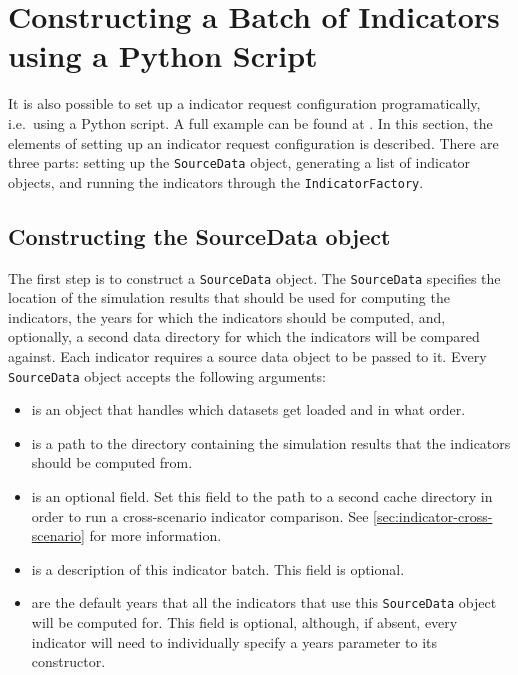 \section{Constructing a Batch of Indicators using a Python Script}
\label{sec:indicator-configuration-script}

It is also possible to set up a indicator request configuration
programatically, i.e.\ using a Python script. A full example can be found at 
. In this 
section, the elements of setting up an indicator request configuration 
is described. There are three parts: setting up the \verb|SourceData| 
object, generating a list of indicator objects, and running the 
indicators through the \verb|IndicatorFactory|.

\subsection{Constructing the SourceData object}
\label{subsec:SourceData}
The first step is to construct a \verb|SourceData| object.
The \verb|SourceData| specifies 
the location of the simulation results that should be 
used for computing the indicators, the years for which the indicators should be
computed, and, optionally, a second data directory for which the indicators will
be compared against. Each indicator requires a source data object to be passed
to it. Every \verb|SourceData| object accepts the following arguments:
\begin{itemize}
\tight
\item {} is an object that handles which 
datasets get loaded and in what order. 

\item {} is a path to the directory containing the 
simulation results that the indicators should be computed from.

\item {} is an optional field. Set this field 
to the path to a second cache directory in order to run a 
cross-scenario indicator comparison. See \ref{sec:indicator-cross-scenario}
for more information.

\item {} is a description of this indicator batch. 
This field is optional. 

\item {} are the default years that all the indicators that use this
\verb|SourceData| object will be computed for.
This field is optional, although, if absent, every indicator will need to
individually specify a years parameter to its constructor. 

\end{itemize}

